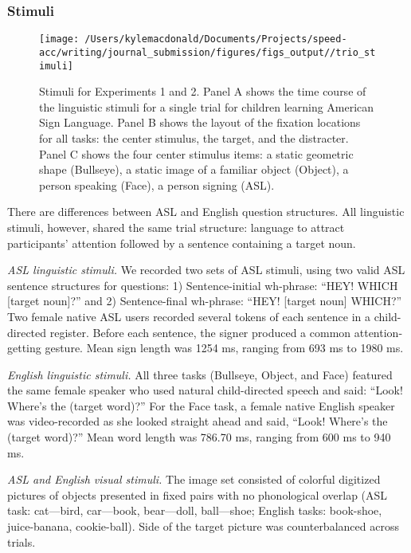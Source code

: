 \documentclass[,man,floatsintext]{apa6}
\begin{document}
\hypertarget{stimuli}{%
\subsubsection{Stimuli}\label{stimuli}}

\begin{figure}[!ht]

{\centering \texttt{[image: /Users/kylemacdonald/Documents/Projects/speed-acc/writing/journal\_submission/figures/figs\_output//trio\_stimuli]} 

}

\caption{Stimuli for Experiments 1 and 2. Panel A shows the time course of the linguistic stimuli for a single trial for children learning American Sign Language. Panel B shows the layout of the fixation locations for all tasks: the center stimulus, the target, and the distracter. Panel C shows the four center stimulus items: a static geometric shape (Bullseye), a static image of a familiar object (Object), a person speaking (Face), a person signing (ASL).}\label{fig:trio-stim}
\end{figure}

There are differences between ASL and English question structures. All linguistic stimuli, however, shared the same trial structure: language to attract participants' attention followed by a sentence containing a target noun.

\emph{ASL linguistic stimuli.} We recorded two sets of ASL stimuli, using two valid ASL sentence structures for questions: 1) Sentence-initial wh-phrase: \enquote{HEY! WHICH {[}target noun{]}?} and 2) Sentence-final wh-phrase: \enquote{HEY! {[}target noun{]} WHICH?} Two female native ASL users recorded several tokens of each sentence in a child-directed register. Before each sentence, the signer produced a common attention-getting gesture. Mean sign length was 1254 ms, ranging from 693 ms to 1980 ms.

\emph{English linguistic stimuli.} All three tasks (Bullseye, Object, and Face) featured the same female speaker who used natural child-directed speech and said: \enquote{Look! Where's the (target word)?} For the Face task, a female native English speaker was video-recorded as she looked straight ahead and said, \enquote{Look! Where's the (target word)?} Mean word length was 786.70 ms, ranging from 600 ms to 940 ms.

\emph{ASL and English visual stimuli.} The image set consisted of colorful digitized pictures of objects presented in fixed pairs with no phonological overlap (ASL task: cat---bird, car---book, bear---doll, ball---shoe; English tasks: book-shoe, juice-banana, cookie-ball). Side of the target picture was counterbalanced across trials.
\end{document}
